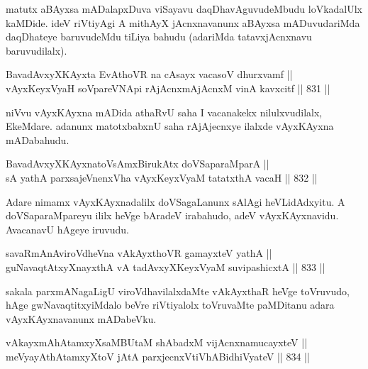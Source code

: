 \begin{artha}
matutx aBAyxsa mADalapxDuva viSayavu daqDhavAguvudeMbudu loVkadalUlx kaMDide. ideV riVtiyAgi A mithAyX jAcnxnavanunx aBAyxsa mADuvudariMda daqDhateye baruvudeMdu tiLiya bahudu (adariMda tatavxjAcnxnavu baruvudilalx).
\end{artha}

\begin{shl}
BavadAvxyXKAyxta EvAthoVR na cAsayx vacasoV dhurxvamf || \\
vAyxKeyxVyaH soV\s pareVNApi rAjAcnxmAjAcnxM vinA kavxcitf \hfill || 831 ||  
\end{shl}
				
\begin{artha}
niVvu vAyxKAyxna mADida athaRvU saha I vacanakekx nilulxvudilalx, EkeMdare. adanunx matotxbabxnU  saha rAjAjecnxye ilalxde vAyxKAyxna mADabahudu.
\end{artha}

\begin{shl}
BavadAvxyXKAyxnatoV\s sAmxBirukAtx doVSaparaMparA || \\
sA yathA parxsajeVnenxVha vAyxKeyxVyaM tatatxthA vacaH \hfill || 832 ||  
\end{shl}

\begin{artha}
Adare nimamx vAyxKAyxnadalilx doVSagaLanunx sAlAgi heVLidAdxyitu. A doVSaparaMpareyu ililx heVge bAradeV irabahudo, adeV vAyxKAyxnavidu.  AvacanavU hAgeye iruvudu.
\end{artha}


\begin{shl}
savaRmAnAviroVdheVna vAkAyxthoVR gamayxteV yathA || \\
guNavaqtAtxyX\s nayxthA vA tadAvxyXKeyxVyaM suvipashicxtA \hfill || 833 ||  
\end{shl}

\begin{artha}
sakala parxmANagaLigU viroVdhavilalxdaMte vAkAyxthaR heVge toVruvudo, hAge gwNavaqtitxyiMdalo beVre riVtiyalolx toVruvaMte paMDitanu adara vAyxKAyxnavanunx mADabeVku.
\end{artha}


\begin{shl}
vAkayxmAhAtamxyXsaMBUtaM shAbadxM vijAcnxnamucayxteV || \\
meVyayAthAtamxyXtoV jAtA parxjecnxVtiVhABidhiVyateV \hfill || 834 ||  
\end{shl}

